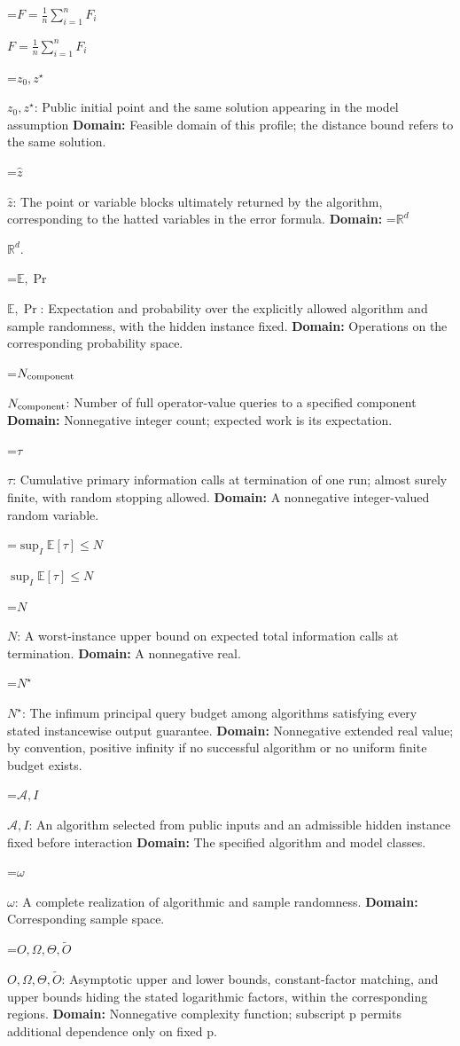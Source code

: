\documentclass[10pt,a4paper]{article}
\newcommand{\AtlasMath}[1]{\par\begingroup\centering\setbox0=\hbox{$\displaystyle #1$}\ifdim\wd0>1.4\linewidth\typeout{ATLAS WIDE FORMULA: \the\wd0}\fi\ifdim\wd0>\linewidth\resizebox{\linewidth}{!}{\box0}\else\box0\fi\par\endgroup}
\newcommand{\AtlasInlineMath}[1]{\begingroup\setbox0=\hbox{$#1$}\ifdim\wd0>.4\linewidth\endgroup\AtlasMath{#1}\else\endgroup$#1$\fi}
\begin{document}
\AtlasInlineMath{F=\frac1n\sum_{i=1}^n F_i}

\AtlasInlineMath{z_0,z^\star}: Public initial point and the same solution appearing in the model assumption \textbf{Domain:} Feasible domain of this profile; the distance bound refers to the same solution.

\AtlasInlineMath{\widehat z}: The point or variable blocks ultimately returned by the algorithm, corresponding to the hatted variables in the error formula. \textbf{Domain:} \AtlasInlineMath{\mathbb R^d}.

\AtlasInlineMath{\mathbb E,\Pr}: Expectation and probability over the explicitly allowed algorithm and sample randomness, with the hidden instance fixed. \textbf{Domain:} Operations on the corresponding probability space.

\AtlasInlineMath{N_{\rm component}}: Number of full operator-value queries to a specified component \textbf{Domain:} Nonnegative integer count; expected work is its expectation.

\AtlasInlineMath{\tau}: Cumulative primary information calls at termination of one run; almost surely finite, with random stopping allowed. \textbf{Domain:} A nonnegative integer-valued random variable.

\AtlasInlineMath{\sup_I\mathbb E[\tau]\le N}

\AtlasInlineMath{N}: A worst-instance upper bound on expected total information calls at termination. \textbf{Domain:} A nonnegative real.

\AtlasInlineMath{N^\star}: The infimum principal query budget among algorithms satisfying every stated instancewise output guarantee. \textbf{Domain:} Nonnegative extended real value; by convention, positive infinity if no successful algorithm or no uniform finite budget exists.

\AtlasInlineMath{\mathcal A,I}: An algorithm selected from public inputs and an admissible hidden instance fixed before interaction \textbf{Domain:} The specified algorithm and model classes.

\AtlasInlineMath{\omega}: A complete realization of algorithmic and sample randomness. \textbf{Domain:} Corresponding sample space.

\AtlasInlineMath{O,\Omega,\Theta,\widetilde O}: Asymptotic upper and lower bounds, constant-factor matching, and upper bounds hiding the stated logarithmic factors, within the corresponding regions. \textbf{Domain:} Nonnegative complexity function; subscript p permits additional dependence only on fixed p.
\end{document}
